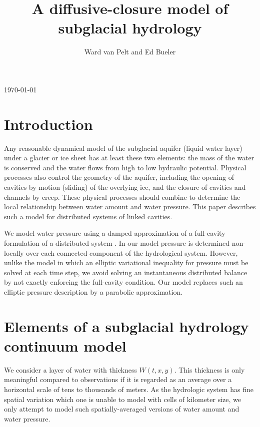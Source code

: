 \documentclass[11pt,final]{amsart}%
\title[]{A diffusive-closure model of subglacial hydrology}
\author[]{Ward van Pelt and Ed Bueler}
\begin{document}
\scriptsize \hfill \today \normalsize
\vspace{0.5in}

\maketitle
\thispagestyle{empty}

\section{Introduction}

Any reasonable dynamical model of the subglacial aquifer (liquid water layer) under a glacier or ice sheet has at least these two elements: the mass of the water is conserved and the water flows from high to low hydraulic potential.  Physical processes also control the geometry of the aquifer, including the opening of cavities by motion (sliding) of the overlying ice, and the closure of cavities and channels by creep.  These physical processes should combine to determine the local relationship between water amount and water pressure.  This paper describes such a model for distributed systems of linked cavities. 

We model water pressure using a damped approximation of a full-cavity formulation of a distributed system \cite{Schoofetal2012}.  In our model pressure is determined non-locally over each connected component of the hydrological system.  However, unlike the \cite{Schoofetal2012} model in which an elliptic variational inequality for pressure must be solved at each time step, we avoid solving an instantaneous distributed balance by not exactly enforcing the full-cavity condition.  Our model replaces such an elliptic pressure description by a parabolic approximation.


\section{Elements of a subglacial hydrology continuum model}

We consider a layer of water with thickness $W(t,x,y)$.  This thickness is only meaningful compared to observations if it is regarded as an average \citep{FlowersClarke2002_theory} over a horizontal scale of tens to thousands of meters.  As the hydrologic system has fine spatial variation which one is unable to model with cells of kilometer size, we only attempt to model such spatially-averaged versions of water amount and water pressure.
\end{document}
